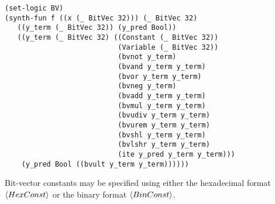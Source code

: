 \documentclass[english,a4paper,10pt]{article}
\begin{document}
\begin{appendix}
\begin{comment}
\begin{lstlisting}[basicstyle={\ttfamily}]
(set-logic BV)
(synth-fun f ((x (_ BitVec 32))) (_ BitVec 32)
   ((y_term (_ BitVec 32)) (y_pred Bool))
   ((y_term (_ BitVec 32) ((Constant (_ BitVec 32))
                           (Variable (_ BitVec 32))
                           (bvnot y_term)
                           (bvand y_term y_term)
                           (bvor y_term y_term)
                           (bvneg y_term)
                           (bvadd y_term y_term)
                           (bvmul y_term y_term)
                           (bvudiv y_term y_term)
                           (bvurem y_term y_term)
                           (bvshl y_term y_term)
                           (bvlshr y_term y_term)
                           (bvnand y_term y_term)
                           (bvnor y_term y_term)
                           (bvxor y_term y_term)
                           (bvxnor y_term y_term)
                           (bvsub y_term y_term)
                           (bvsdiv y_term y_term)
                           (bvsrem y_term y_term)
                           (bvsmod y_term y_term)
                           (bvashr y_term y_term)
                           (ite y_pred y_term y_term)))
    (y_pred Bool (...
                  (bvult y_term y_term)
                  (bvule y_term y_term)
                  (bvugt y_term y_term)
                  (bvuge y_term y_term)
                  (bvslt y_term y_term)
                  (bvsle y_term y_term)
                  (bvsgt y_term y_term)
                  (bvsge y_term y_term))))))
\end{lstlisting}
\end{comment}
\begin{lstlisting}[basicstyle={\ttfamily}]
(set-logic BV)
(synth-fun f ((x (_ BitVec 32))) (_ BitVec 32)
   ((y_term (_ BitVec 32)) (y_pred Bool))
   ((y_term (_ BitVec 32) ((Constant (_ BitVec 32))
                           (Variable (_ BitVec 32))
                           (bvnot y_term)
                           (bvand y_term y_term)
                           (bvor y_term y_term)
                           (bvneg y_term)
                           (bvadd y_term y_term)
                           (bvmul y_term y_term)
                           (bvudiv y_term y_term)
                           (bvurem y_term y_term)
                           (bvshl y_term y_term)
                           (bvlshr y_term y_term)
                           (ite y_pred y_term y_term)))
    (y_pred Bool ((bvult y_term y_term))))))
\end{lstlisting}
Bit-vector constants may be specified
using either the hexadecimal format $\left\langle HexConst\right\rangle$
or the binary format $\left\langle BinConst\right\rangle$.



\end{appendix}
\end{document}
